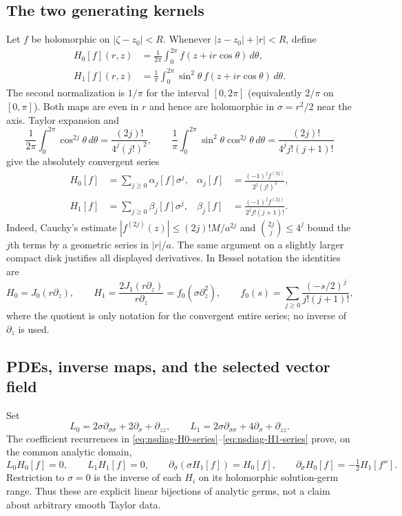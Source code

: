 \subsection{The two generating kernels}

Let $f$ be holomorphic on $|\zeta-z_0|<R$.  Whenever
$|z-z_0|+|r|<R$, define
\begin{align}
 H_0[f](r,z)&=\frac1{2\pi}\int_0^{2\pi}
 f(z+ir\cos\theta)\,d\theta,\label{eq:nsdiag-H0}\\
 H_1[f](r,z)&=\frac1\pi\int_0^{2\pi}
 \sin^2\theta\,f(z+ir\cos\theta)\,d\theta.\label{eq:nsdiag-H1}
\end{align}
The second normalization is $1/\pi$ for the interval $[0,2\pi]$ (equivalently
$2/\pi$ on $[0,\pi]$).  Both maps are even in $r$ and hence are holomorphic
in $\sigma=r^2/2$ near the axis.  Taylor expansion and
\[
 \frac1{2\pi}\int_0^{2\pi}\cos^{2j}\theta\,d\theta
 =\frac{(2j)!}{4^j(j!)^2},\quad\quad
 \frac1\pi\int_0^{2\pi}\sin^2\theta\cos^{2j}\theta\,d\theta
 =\frac{(2j)!}{4^j j!(j+1)!}
\]
give the absolutely convergent series
\begin{align}
 H_0[f]&=\sum_{j\geq0}\alpha_j[f]\sigma^j,&
 \alpha_j[f]&=\frac{(-1)^j f^{(2j)}}{2^j(j!)^2},\label{eq:nsdiag-H0-series}\\
 H_1[f]&=\sum_{j\geq0}\beta_j[f]\sigma^j,&
 \beta_j[f]&=\frac{(-1)^j f^{(2j)}}{2^j j!(j+1)!}.
 \label{eq:nsdiag-H1-series}
\end{align}
Indeed, Cauchy's estimate $|f^{(2j)}(z)|\leq(2j)!M/a^{2j}$ and
${2j\choose j}\leq4^j$ bound the $j$th terms by a geometric series in
$|r|/a$.  The same argument on a slightly larger compact disk justifies
all displayed derivatives.  In Bessel notation the identities are
\[
 H_0=J_0(r\partial_z),\qquad
 H_1=\frac{2J_1(r\partial_z)}{r\partial_z}
 =f_0(\sigma\partial_z^2),\quad\quad
 f_0(s)=\sum_{j\geq0}\frac{(-s/2)^j}{j!(j+1)!},
\]
where the quotient is only notation for the convergent entire series; no
inverse of $\partial_z$ is used.

\subsection{PDEs, inverse maps, and the selected vector field}

Set
\[
 L_0=2\sigma\partial_{\sigma\sigma}+2\partial_\sigma+\partial_{zz},
 \qquad
 L_1=2\sigma\partial_{\sigma\sigma}+4\partial_\sigma+\partial_{zz}.
\]
The coefficient recurrences in \eqref{eq:nsdiag-H0-series}--\eqref{eq:nsdiag-H1-series}
prove, on the common analytic domain,
\begin{equation}\label{eq:ns-H-pdes}
 L_0H_0[f]=0,\qquad L_1H_1[f]=0,\quad\quad
 \partial_\sigma(\sigma H_1[f])=H_0[f],\quad\quad
 \partial_\sigma H_0[f]=-\tfrac12H_1[f''].
\end{equation}
Restriction to $\sigma=0$ is the inverse of each $H_i$ on its holomorphic
solution-germ range.  Thus these are explicit linear bijections of analytic
germs, not a claim about arbitrary smooth Taylor data.

